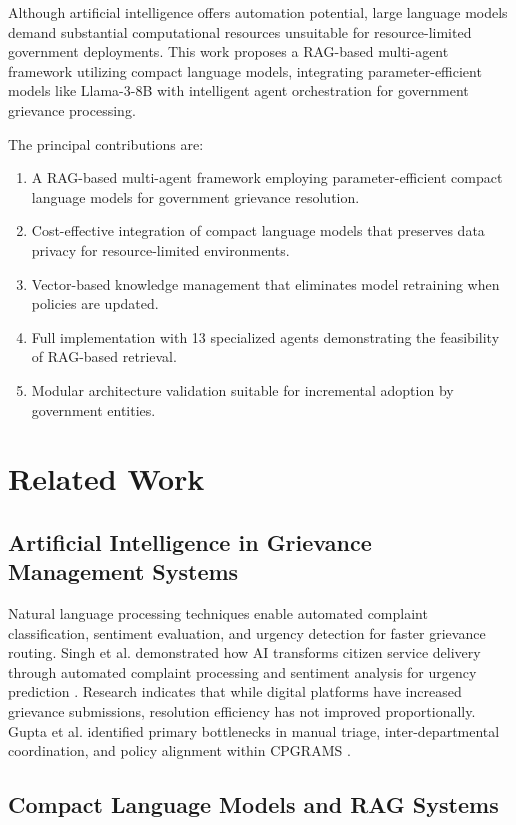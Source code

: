 \documentclass[conference]{IEEEtran}
\begin{document}
Although artificial intelligence offers automation potential, large language models demand substantial computational resources unsuitable for resource-limited government deployments. This work proposes a RAG-based multi-agent framework utilizing compact language models, integrating parameter-efficient models like Llama-3-8B with intelligent agent orchestration for government grievance processing.

The principal contributions are: 
\begin{enumerate}
\item A RAG-based multi-agent framework employing parameter-efficient compact language models for government grievance resolution.
\item Cost-effective integration of compact language models that preserves data privacy for resource-limited environments.
\item Vector-based knowledge management that eliminates model retraining when policies are updated.
\item Full implementation with 13 specialized agents demonstrating the feasibility of RAG-based retrieval.
\item Modular architecture validation suitable for incremental adoption by government entities.
\end{enumerate}

\section{Related Work}

\subsection{Artificial Intelligence in Grievance Management Systems}

Natural language processing techniques enable automated complaint classification, sentiment evaluation, and urgency detection for faster grievance routing. Singh et al. demonstrated how AI transforms citizen service delivery through automated complaint processing and sentiment analysis for urgency prediction \cite{b1}. Research indicates that while digital platforms have increased grievance submissions, resolution efficiency has not improved proportionally. Gupta et al. identified primary bottlenecks in manual triage, inter-departmental coordination, and policy alignment within CPGRAMS \cite{b2}.

\subsection{Compact Language Models and RAG Systems}
\end{document}

